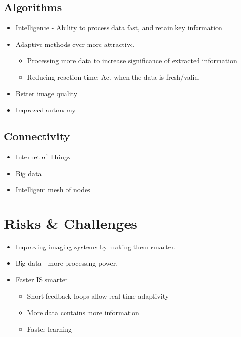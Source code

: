 \subsection{Algorithms}

\begin{itemize}
\item Intelligence - Ability to process data fast, and retain key information
\item Adaptive methods ever more attractive.
   \begin{itemize}
   \item Processing more data to increase significance of extracted information
   \item Reducing reaction time: Act when the data is fresh/valid.
   \end{itemize}
\item Better image quality
\item Improved autonomy
\end{itemize}


\subsection{Connectivity}

\begin{itemize}
\item Internet of Things
\item Big data
\item Intelligent mesh of nodes
\end{itemize}

\section{Risks \& Challenges}



\begin{itemize}
\item Improving imaging systems by making them smarter.
\item Big data - more processing power.
\item Faster IS smarter
 \begin{itemize}
 	\item Short feedback loops allow real-time adaptivity
 	\item More data contains more information
 	\item Faster learning
 \end{itemize}
\end{itemize}




